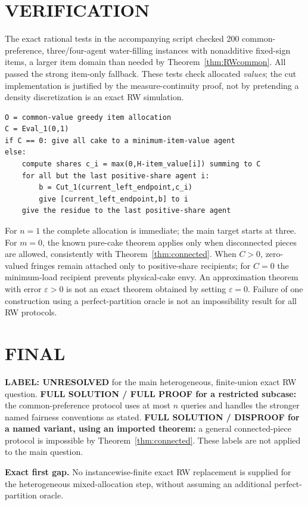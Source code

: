 \documentclass[11pt,a4paper]{article}
\theoremstyle{remark}\newtheorem{remark}[theorem]{Remark}
\begin{document}
\section{VERIFICATION}
The exact rational tests in the accompanying script checked 200 common-preference, three/four-agent water-filling instances with nonadditive fixed-sign items, a larger item domain than needed by Theorem~\ref{thm:RWcommon}. All passed the strong item-only fallback. These tests check allocated \emph{values}; the cut implementation is justified by the measure-continuity proof, not by pretending a density discretization is an exact RW simulation.
\begin{lstlisting}
O = common-value greedy item allocation
C = Eval_1(0,1)
if C == 0: give all cake to a minimum-item-value agent
else:
    compute shares c_i = max(0,H-item_value[i]) summing to C
    for all but the last positive-share agent i:
        b = Cut_1(current_left_endpoint,c_i)
        give [current_left_endpoint,b] to i
    give the residue to the last positive-share agent
\end{lstlisting}
For $n=1$ the complete allocation is immediate; the main target starts at three. For $m=0$, the known pure-cake theorem applies only when disconnected pieces are allowed, consistently with Theorem~\ref{thm:connected}. When $C>0$, zero-valued fringes remain attached only to positive-share recipients; for $C=0$ the minimum-load recipient prevents physical-cake envy. An approximation theorem with error $\varepsilon>0$ is not an exact theorem obtained by setting $\varepsilon=0$. Failure of one construction using a perfect-partition oracle is not an impossibility result for all RW protocols.

\section{FINAL}
\textbf{LABEL: UNRESOLVED} for the main heterogeneous, finite-union exact RW question.
\textbf{FULL SOLUTION / FULL PROOF for a restricted subcase:} the common-preference protocol uses at most $n$ queries and handles the stronger named fairness conventions as stated. \textbf{FULL SOLUTION / DISPROOF for a named variant, using an imported theorem:} a general connected-piece protocol is impossible by Theorem~\ref{thm:connected}. These labels are not applied to the main question.

\textbf{Exact first gap.} No instancewise-finite exact RW replacement is supplied for the heterogeneous mixed-allocation step, without assuming an additional perfect-partition oracle.
\end{document}
